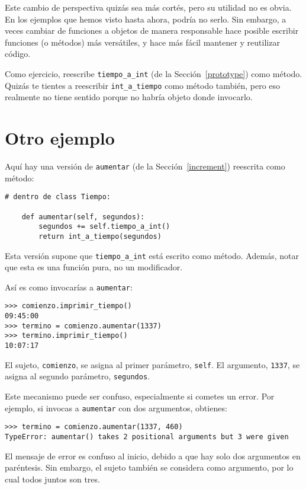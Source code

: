 \documentclass[10pt]{book}
\begin{document}
Este cambio de perspectiva quizás sea más cortés, pero su utilidad
no es obvia.  En los ejemplos que hemos visto hasta ahora, podría no
serlo.  Sin embargo, a veces cambiar de funciones a objetos de manera
responsable hace posible escribir funciones (o métodos) más versátiles,
y hace más fácil mantener y reutilizar código.

Como ejercicio, reescribe \verb"tiempo_a_int" (de la
Sección~\ref{prototype}) como método.  Quizás te tientes a
reescribir \verb"int_a_tiempo" como método también, pero eso realmente
no tiene sentido porque no habría objeto donde
invocarlo.


\section{Otro ejemplo}

Aquí hay una versión de {\tt aumentar} (de la Sección~\ref{increment})
reescrita como método:

\begin{verbatim}
# dentro de class Tiempo:

    def aumentar(self, segundos):
        segundos += self.tiempo_a_int()
        return int_a_tiempo(segundos)
\end{verbatim}
%
Esta versión supone que \verb"tiempo_a_int" está escrito
como método.  Además, notar que
esta es una función pura, no un modificador.

Así es como invocarías a {\tt aumentar}:

\begin{verbatim}
>>> comienzo.imprimir_tiempo()
09:45:00
>>> termino = comienzo.aumentar(1337)
>>> termino.imprimir_tiempo()
10:07:17
\end{verbatim}
%
El sujeto, {\tt comienzo}, se asigna al primer parámetro,
{\tt self}.  El argumento, {\tt 1337}, se asigna al
segundo parámetro, {\tt segundos}.

Este mecanismo puede ser confuso, especialmente si cometes un error.
Por ejemplo, si invocas a {\tt aumentar} con dos argumentos,
obtienes:

\begin{verbatim}
>>> termino = comienzo.aumentar(1337, 460)
TypeError: aumentar() takes 2 positional arguments but 3 were given
\end{verbatim}
%
El mensaje de error es confuso al inicio, debido a que hay
solo dos argumentos en paréntesis.  Sin embargo, el sujeto también
se considera como argumento, por lo cual todos juntos son tres.
\end{document}
